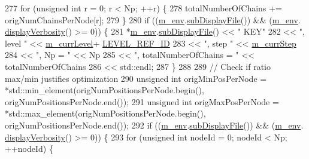 \begin{DoxyCode}
277       \textcolor{keywordflow}{for} (\textcolor{keywordtype}{unsigned} \textcolor{keywordtype}{int} r = 0; r < Np; ++r) \{
278         totalNumberOfChains += origNumChainsPerNode[r];
279       \}
280       \textcolor{keywordflow}{if} ((\hyperlink{class_q_u_e_s_o_1_1_m_l_sampling_a13f1ca4fe9f94822fe572a743eaced1d}{m\_env}.\hyperlink{class_q_u_e_s_o_1_1_base_environment_a8a0064746ae8dddfece4229b9ad374d6}{subDisplayFile}()) && (\hyperlink{class_q_u_e_s_o_1_1_m_l_sampling_a13f1ca4fe9f94822fe572a743eaced1d}{m\_env}.
      \hyperlink{class_q_u_e_s_o_1_1_base_environment_a1fe5f244fc0316a0ab3e37463f108b96}{displayVerbosity}() >= 0)) \{
281         *\hyperlink{class_q_u_e_s_o_1_1_m_l_sampling_a13f1ca4fe9f94822fe572a743eaced1d}{m\_env}.\hyperlink{class_q_u_e_s_o_1_1_base_environment_a8a0064746ae8dddfece4229b9ad374d6}{subDisplayFile}() << \textcolor{stringliteral}{"  KEY"}
282                                 << \textcolor{stringliteral}{", level "} << \hyperlink{class_q_u_e_s_o_1_1_m_l_sampling_af9416874c856e50f3b35270e801f17e4}{m\_currLevel}+
      \hyperlink{_m_l_sampling_level_options_8h_a68d15eaf394d210effcf584b938206d3}{LEVEL\_REF\_ID}
283                                 << \textcolor{stringliteral}{", step "}  << \hyperlink{class_q_u_e_s_o_1_1_m_l_sampling_a1b1f8ccb4823bdfa26ec652f0807c63e}{m\_currStep}
284                                 << \textcolor{stringliteral}{", Np = "}  << Np
285                                 << \textcolor{stringliteral}{", totalNumberOfChains = "} << totalNumberOfChains
286                                 << std::endl;
287       \}
288 
289       \textcolor{comment}{// Check if ratio max/min justifies optimization}
290       \textcolor{keywordtype}{unsigned} \textcolor{keywordtype}{int} origMinPosPerNode  = *std::min\_element(origNumPositionsPerNode.begin(), 
      origNumPositionsPerNode.end());
291       \textcolor{keywordtype}{unsigned} \textcolor{keywordtype}{int} origMaxPosPerNode  = *std::max\_element(origNumPositionsPerNode.begin(), 
      origNumPositionsPerNode.end());
292       \textcolor{keywordflow}{if} ((\hyperlink{class_q_u_e_s_o_1_1_m_l_sampling_a13f1ca4fe9f94822fe572a743eaced1d}{m\_env}.\hyperlink{class_q_u_e_s_o_1_1_base_environment_a8a0064746ae8dddfece4229b9ad374d6}{subDisplayFile}()) && (\hyperlink{class_q_u_e_s_o_1_1_m_l_sampling_a13f1ca4fe9f94822fe572a743eaced1d}{m\_env}.
      \hyperlink{class_q_u_e_s_o_1_1_base_environment_a1fe5f244fc0316a0ab3e37463f108b96}{displayVerbosity}() >= 0)) \{
293         \textcolor{keywordflow}{for} (\textcolor{keywordtype}{unsigned} \textcolor{keywordtype}{int} nodeId = 0; nodeId < Np; ++nodeId) \{

\end{DoxyCode}
